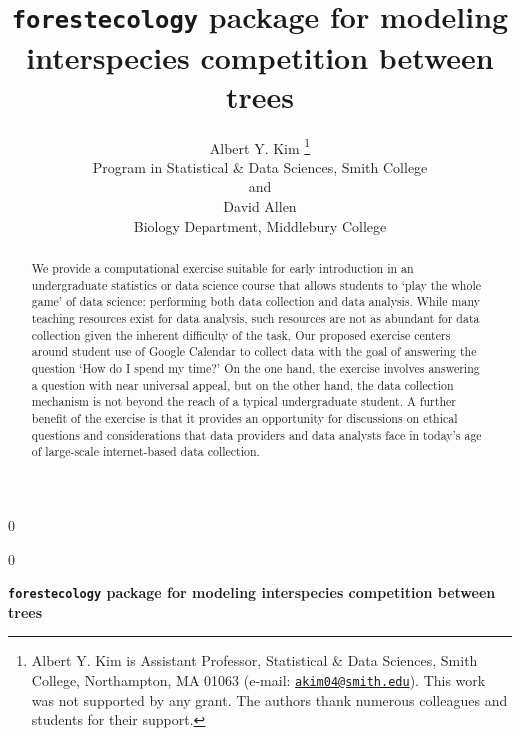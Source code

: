 \documentclass[12pt]{article}
\newcommand{\blind}{0}
\begin{document}
\def\spacingset#1{\renewcommand{\baselinestretch}%
{#1}\small\normalsize} \spacingset{1}



\blind
{
  \title{\bf \texttt{forestecology} package for modeling interspecies competition
between trees}

  \author{
        Albert Y. Kim \thanks{Albert Y. Kim is Assistant Professor, Statistical \& Data Sciences,
Smith College, Northampton, MA 01063 (e-mail:
\href{mailto:akim04@smith.edu}{\nolinkurl{akim04@smith.edu}}). This work
was not supported by any grant. The authors thank numerous colleagues
and students for their support.} \\
    Program in Statistical \& Data Sciences, Smith College\\
     and \\     David Allen \\
    Biology Department, Middlebury College\\
      }
  \maketitle
} \fi

\blind
{
  \bigskip
  \bigskip
  \bigskip
  \begin{center}
    {\LARGE\bf \texttt{forestecology} package for modeling interspecies competition
between trees}
  \end{center}
  \medskip
} \fi

\bigskip
\begin{abstract}
We provide a computational exercise suitable for early introduction in
an undergraduate statistics or data science course that allows students
to `play the whole game' of data science: performing both data
collection and data analysis. While many teaching resources exist for
data analysis, such resources are not as abundant for data collection
given the inherent difficulty of the task. Our proposed exercise centers
around student use of Google Calendar to collect data with the goal of
answering the question `How do I spend my time?' On the one hand, the
exercise involves answering a question with near universal appeal, but
on the other hand, the data collection mechanism is not beyond the reach
of a typical undergraduate student. A further benefit of the exercise is
that it provides an opportunity for discussions on ethical questions and
considerations that data providers and data analysts face in today's age
of large-scale internet-based data collection.
\end{abstract}
\end{document}
